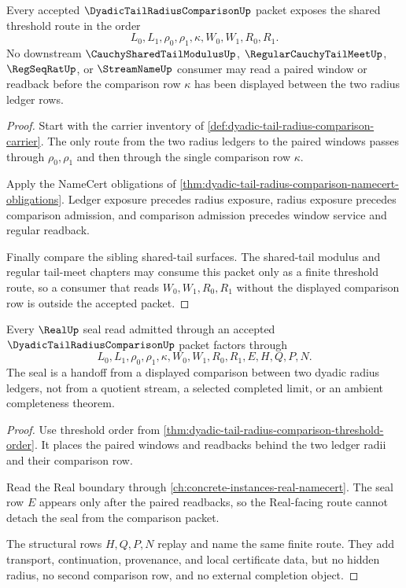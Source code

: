 \begin{theorem}
\label{thm:dyadic-tail-radius-comparison-threshold-order}
Every accepted $\DyadicTailRadiusComparisonUp$ packet exposes the shared threshold route in the order
$$
L_0,L_1,\rho_0,\rho_1,\kappa,W_0,W_1,R_0,R_1.
$$
No downstream $\CauchySharedTailModulusUp$, $\RegularCauchyTailMeetUp$, $\RegSeqRatUp$, or $\StreamNameUp$ consumer may read a paired window or readback before the comparison row $\kappa$ has been displayed between the two radius ledger rows.
\end{theorem}
\begin{proof}
Start with the carrier inventory of \autoref{def:dyadic-tail-radius-comparison-carrier}. The only route from the two radius ledgers to the paired windows passes through $\rho_0,\rho_1$ and then through the single comparison row $\kappa$.

Apply the NameCert obligations of \autoref{thm:dyadic-tail-radius-comparison-namecert-obligations}. Ledger exposure precedes radius exposure, radius exposure precedes comparison admission, and comparison admission precedes window service and regular readback.

Finally compare the sibling shared-tail surfaces. The shared-tail modulus and regular tail-meet chapters may consume this packet only as a finite threshold route, so a consumer that reads $W_0,W_1,R_0,R_1$ without the displayed comparison row is outside the accepted packet.
\end{proof}

\begin{theorem}
\label{thm:dyadic-tail-radius-comparison-realseal-handoff}
Every $\RealUp$ seal read admitted through an accepted $\DyadicTailRadiusComparisonUp$ packet factors through
$$
L_0,L_1,\rho_0,\rho_1,\kappa,W_0,W_1,R_0,R_1,E,H,Q,P,N.
$$
The seal is a handoff from a displayed comparison between two dyadic radius ledgers, not from a quotient stream, a selected completed limit, or an ambient completeness theorem.
\end{theorem}
\begin{proof}
Use threshold order from \autoref{thm:dyadic-tail-radius-comparison-threshold-order}. It places the paired windows and readbacks behind the two ledger radii and their comparison row.

Read the Real boundary through \autoref{ch:concrete-instances-real-namecert}. The seal row $E$ appears only after the paired readbacks, so the Real-facing route cannot detach the seal from the comparison packet.

The structural rows $H,Q,P,N$ replay and name the same finite route. They add transport, continuation, provenance, and local certificate data, but no hidden radius, no second comparison row, and no external completion object.
\end{proof}


